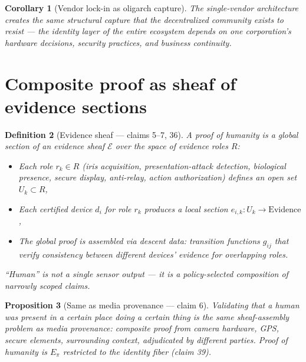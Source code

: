 \documentclass[11pt,a4paper]{article}
\newtheorem{definition}{Definition}[section]
\newtheorem{proposition}[definition]{Proposition}
\newtheorem{corollary}[definition]{Corollary}
\begin{document}
\begin{corollary}[Vendor lock-in as oligarch capture]
The single-vendor architecture creates the same structural capture that
the decentralized community exists to resist --- the identity layer of
the entire ecosystem depends on one corporation's hardware decisions,
security practices, and business continuity.
\end{corollary}

\section{Composite proof as sheaf of evidence sections}
\label{sec:composite}

\begin{definition}[Evidence sheaf --- claims 5--7, 36]
\label{def:evidence-sheaf}
A \emph{proof of humanity} is a global section of an evidence sheaf
$\mathcal{E}$ over the space of evidence roles $R$:
\begin{itemize}
\item Each role $r_k \in R$ (iris acquisition, presentation-attack detection,
  biological presence, secure display, anti-relay, action authorization)
  defines an open set $U_k \subset R$,
\item Each certified device $d_i$ for role $r_k$ produces a local section
  $e_{i,k} : U_k \to \text{Evidence}$,
\item The global proof is assembled via descent data: transition functions
  $g_{ij}$ that verify consistency between different devices' evidence
  for overlapping roles.
\end{itemize}
``Human'' is not a single sensor output --- it is a policy-selected
composition of narrowly scoped claims.
\end{definition}

\begin{proposition}[Same as media provenance --- claim 6]
\label{prop:media}
Validating that a human was present in a certain place doing a certain
thing is the same sheaf-assembly problem as media provenance: composite
proof from camera hardware, GPS, secure elements, surrounding context,
adjudicated by different parties. Proof of humanity is $E_\pi$ restricted
to the identity fiber (claim 39).
\end{proposition}
\end{document}
